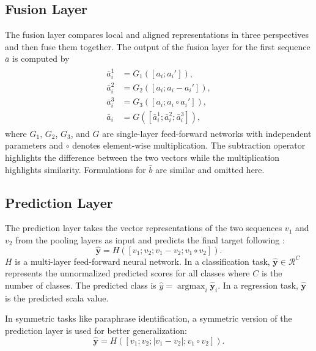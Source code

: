 \documentclass[11pt,a4paper]{article}
\begin{document}
\subsection{Fusion Layer}
The fusion layer compares local and aligned representations in three perspectives and then fuse them together. The output of the fusion layer for the first sequence $\bar a$ is computed by
\begin{align}
  \begin{split}
  \bar a^1_i &= G_1([a_i; a_i']), \\
  \bar a^2_i &= G_2([a_i; a_i - a_i']), \\
  \bar a^3_i &= G_3([a_i; a_i \circ a_i']), \\
  \bar a_i &= G([\bar a^1_i; \bar a^2_i; \bar a^3_i]),
  \end{split}
\end{align}
where $G_1$, $G_2$, $G_3$, and $G$ are single-layer feed-forward networks with independent parameters and $\circ$ denotes element-wise multiplication. The subtraction operator highlights the difference between the two vectors while the multiplication highlights similarity. Formulations for $\bar b$ are similar and omitted here.

\subsection{Prediction Layer}
The prediction layer takes the vector representations of the two sequences $v_1$ and $v_2$ from the pooling layers as input and predicts the final target following \citeauthor{mou2016natural} :
\begin{equation}
\hat {\mathbf y} = 
H([v_1; v_2; v_1 - v_2; v_1 \circ v_2]). 
\label{eq:standard_pred}
\end{equation}
$H$ is a multi-layer feed-forward neural network. In a classification task, $\hat {\mathbf y} \in \mathcal{R}^C$ represents the unnormalized predicted scores for all classes where $C$ is the number of classes. The predicted class is $\hat y=\operatorname{argmax}_i \hat {\mathbf y}_i$. In a regression task, $\hat {\mathbf y}$ is the predicted scala value.

In symmetric tasks like paraphrase identification, a symmetric version of the prediction layer is used for better generalization:
\begin{equation}
\hat {\mathbf y} = H([v_1; v_2; |v_1 - v_2|; v_1 \circ v_2]). 
\label{eq:symmetric_pred}
\end{equation}
\end{document}

